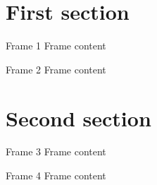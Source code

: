 \documentclass[aspectratio=43]{beamer}    %
\begin{document}
     \frame[plain]{\titlepage}
  
    \begin{frame}{\contentsname}
        \tableofcontents
    \end{frame}

    \section{First section}
    \begin{frame}{Frame 1}
        Frame content
    \end{frame}
    \begin{frame}{Frame 2}
        Frame content
    \end{frame}

    \section{Second section}
    \begin{frame}{Frame 3}
        Frame content
    \end{frame}
    \begin{frame}{Frame 4}
        Frame content
    \end{frame}
\end{document}
